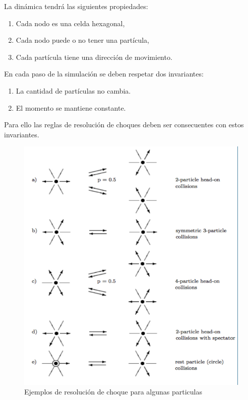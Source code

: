 \documentclass[10pt,a4paper]{article}
\begin{document}
La din\'amica tendr\'a las siguientes propiedades:
\begin{enumerate}
\item Cada nodo es una celda hexagonal,
\item Cada nodo puede o no tener una part\'icula,
\item Cada part\'icula tiene una direcci\'on de movimiento.
\end{enumerate}

En cada paso de la simulaci\'on se deben respetar dos invariantes:

\begin{enumerate}
\item La cantidad de part\'iculas no cambia.
\item El momento se mantiene constante.
\end{enumerate}

Para ello las reglas de resoluci\'on de choques deben ser consecuentes con estos invariantes.

\begin{figure}[H]
\centering
\includegraphics[scale=0.4]{colisiones}
\caption{Ejemplos de resoluci\'on de choque para algunas particulas}
\end{figure}
\end{document}
